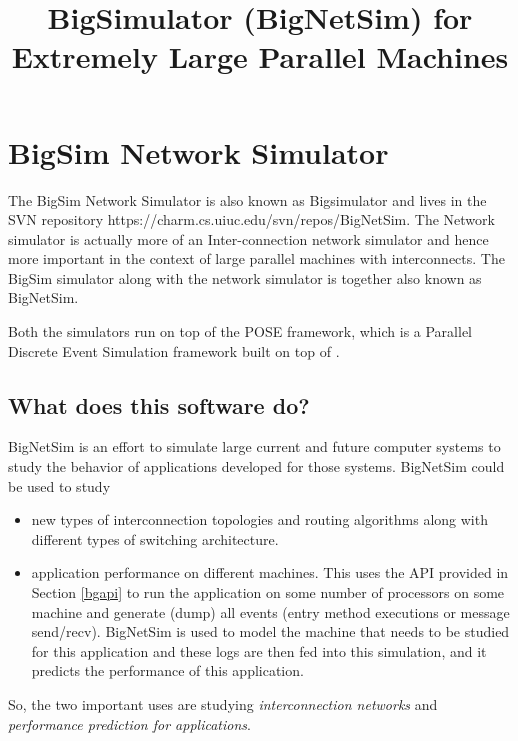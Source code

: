 \documentclass[10pt]{article}
\title{BigSimulator (BigNetSim) for Extremely Large Parallel Machines}
\begin{document}
\maketitle

\section{BigSim Network Simulator}
\label{bignetsim}

The BigSim Network Simulator is also known as Bigsimulator and lives
in the SVN repository https://charm.cs.uiuc.edu/svn/repos/BigNetSim.
The Network simulator is actually more of an Inter-connection network
simulator and hence more important in the context of large parallel
machines with interconnects.
The BigSim simulator  along with the network simulator is together
also known as BigNetSim.

Both the simulators run on top of the POSE framework, which is a Parallel
Discrete Event Simulation framework built on top of \charmpp{}.


\subsection{What does this software do?}
BigNetSim is an effort to simulate large current and future computer
systems to study the behavior of applications developed for those systems.
BigNetSim could be used to study
\begin{itemize}
\item  new types of interconnection topologies and routing algorithms
along with different types of switching architecture.
\item application performance on different machines. This uses the API
provided in Section \ref{bgapi} to run the application on some number
of processors on some machine and generate (dump) all events (entry
method executions or message send/recv).  BigNetSim is used to
model the machine that needs to be studied for this application and
these logs are then fed into this simulation, and it predicts the
performance of this application.
\end{itemize}

So, the two important uses are studying {\it interconnection networks} and
{\it performance prediction for applications}.










\end{document}
